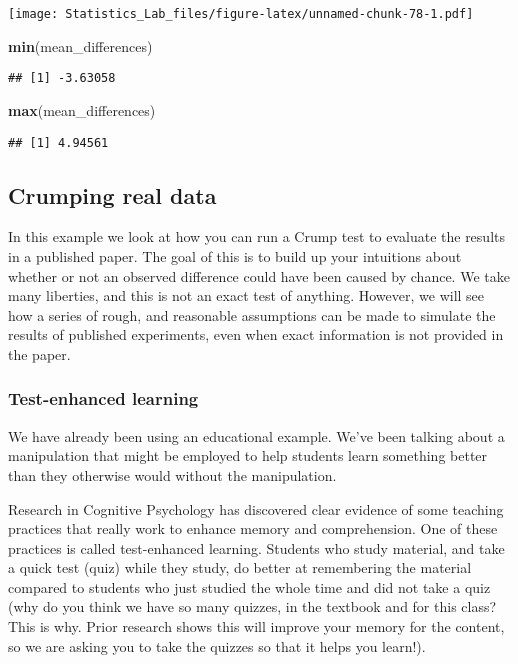 \documentclass[
]{book}
\newenvironment{Shaded}{\begin{snugshade}}{\end{snugshade}}
\newcommand{\FunctionTok}[1]{\textcolor[rgb]{0.13,0.29,0.53}{\textbf{#1}}}
\newcommand{\NormalTok}[1]{#1}
\begin{document}
\texttt{[image: Statistics\_Lab\_files/figure-latex/unnamed-chunk-78-1.pdf]}

\begin{Shaded}
\begin{Highlighting}[]
\FunctionTok{min}\NormalTok{(mean\_differences)}
\end{Highlighting}
\end{Shaded}

\begin{verbatim}
## [1] -3.63058
\end{verbatim}

\begin{Shaded}
\begin{Highlighting}[]
\FunctionTok{max}\NormalTok{(mean\_differences)}
\end{Highlighting}
\end{Shaded}

\begin{verbatim}
## [1] 4.94561
\end{verbatim}

\hypertarget{crumping-real-data}{%
\subsection{Crumping real data}\label{crumping-real-data}}

In this example we look at how you can run a Crump test to evaluate the results in a published paper. The goal of this is to build up your intuitions about whether or not an observed difference could have been caused by chance. We take many liberties, and this is not an exact test of anything. However, we will see how a series of rough, and reasonable assumptions can be made to simulate the results of published experiments, even when exact information is not provided in the paper.

\hypertarget{test-enhanced-learning}{%
\subsubsection{Test-enhanced learning}\label{test-enhanced-learning}}

We have already been using an educational example. We've been talking about a manipulation that might be employed to help students learn something better than they otherwise would without the manipulation.

Research in Cognitive Psychology has discovered clear evidence of some teaching practices that really work to enhance memory and comprehension. One of these practices is called test-enhanced learning. Students who study material, and take a quick test (quiz) while they study, do better at remembering the material compared to students who just studied the whole time and did not take a quiz (why do you think we have so many quizzes, in the textbook and for this class? This is why. Prior research shows this will improve your memory for the content, so we are asking you to take the quizzes so that it helps you learn!).
\end{document}
